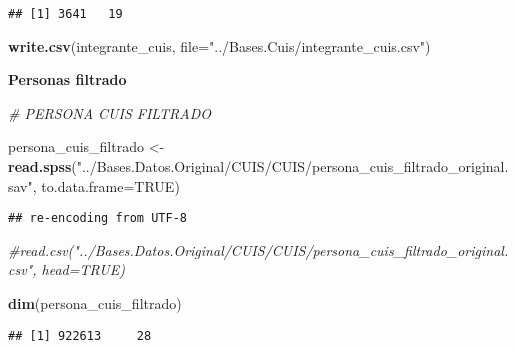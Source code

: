 \documentclass[11pt,]{article}
\newenvironment{Shaded}{\begin{snugshade}}{\end{snugshade}}
\newcommand{\KeywordTok}[1]{\textcolor[rgb]{0.13,0.29,0.53}{\textbf{#1}}}
\newcommand{\DataTypeTok}[1]{\textcolor[rgb]{0.13,0.29,0.53}{#1}}
\newcommand{\DecValTok}[1]{\textcolor[rgb]{0.00,0.00,0.81}{#1}}
\newcommand{\StringTok}[1]{\textcolor[rgb]{0.31,0.60,0.02}{#1}}
\newcommand{\CommentTok}[1]{\textcolor[rgb]{0.56,0.35,0.01}{\textit{#1}}}
\newcommand{\OtherTok}[1]{\textcolor[rgb]{0.56,0.35,0.01}{#1}}
\newcommand{\OperatorTok}[1]{\textcolor[rgb]{0.81,0.36,0.00}{\textbf{#1}}}
\newcommand{\NormalTok}[1]{#1}
\begin{document}
\begin{verbatim}
## [1] 3641   19
\end{verbatim}

\begin{Shaded}
\begin{Highlighting}[]
\KeywordTok{write.csv}\NormalTok{(integrante_cuis, }\DataTypeTok{file=}\StringTok{"../Bases.Cuis/integrante_cuis.csv"}\NormalTok{)}
\end{Highlighting}
\end{Shaded}

\textbf{Personas filtrado}

\begin{Shaded}
\begin{Highlighting}[]
\CommentTok{# PERSONA CUIS FILTRADO}

\NormalTok{persona_cuis_filtrado <-}\StringTok{ }\KeywordTok{read.spss}\NormalTok{(}\StringTok{"../Bases.Datos.Original/CUIS/CUIS/persona_cuis_filtrado_original.sav"}\NormalTok{, }\DataTypeTok{to.data.frame=}\OtherTok{TRUE}\NormalTok{)}
\end{Highlighting}
\end{Shaded}

\begin{verbatim}
## re-encoding from UTF-8
\end{verbatim}

\begin{Shaded}
\begin{Highlighting}[]
                        \CommentTok{#read.csv("../Bases.Datos.Original/CUIS/CUIS/persona_cuis_filtrado_original.csv", head=TRUE)}

\KeywordTok{dim}\NormalTok{(persona_cuis_filtrado)}
\end{Highlighting}
\end{Shaded}

\begin{verbatim}
## [1] 922613     28
\end{verbatim}

\begin{Shaded}
\end{Shaded}
\end{document}
